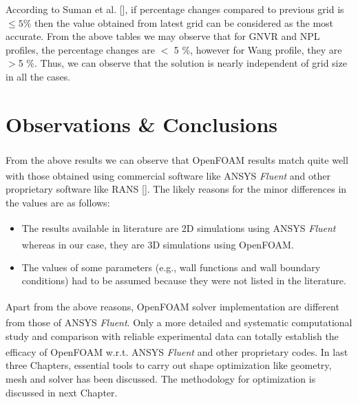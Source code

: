 According to Suman et al. [], if percentage changes compared to previous grid is $\le 5 \%$ then the value obtained from latest grid can be considered as the most accurate. From the above tables we may observe that for GNVR and NPL profiles, the percentage changes are $<$  5 \%, however for Wang profile, they are $>$5 \%. Thus, we can observe that the solution is nearly independent of grid size in all the cases.

\section{Observations \& Conclusions}

From the above results we can observe that OpenFOAM\textsuperscript{\textregistered} results match quite well with those obtained using commercial software like ANSYS\textsuperscript{\textregistered} \textit{Fluent} and other proprietary software like RANS []. The likely reasons for the minor differences in the values are as follows:
\begin{itemize}
	\item The results available in literature are 2D simulations using ANSYS\textsuperscript{\textregistered} \textit{Fluent} whereas in our case, they are 3D simulations using OpenFOAM\textsuperscript{\textregistered}.
	\item The values of some parameters (e.g., wall functions and wall boundary conditions) had to be assumed because they were not listed in the literature.
\end{itemize}
Apart from the above reasons, OpenFOAM\textsuperscript{\textregistered} solver implementation are different from those of ANSYS\textsuperscript{\textregistered} \textit{Fluent}. Only a more detailed and systematic computational study and comparison with reliable experimental data can totally establish the efficacy of OpenFOAM\textsuperscript{\textregistered} w.r.t. ANSYS\textsuperscript{\textregistered} \textit{Fluent} and other proprietary codes.
In last three Chapters, essential tools to carry out shape optimization like geometry, mesh and solver has been discussed. The methodology for optimization is discussed in next Chapter.




